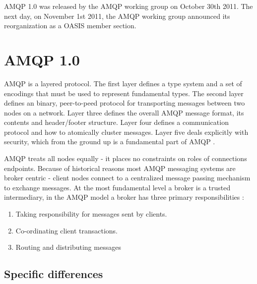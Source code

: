 \documentclass{thesis}
\begin{document}

AMQP 1.0 was released by the AMQP working group on October 30th 2011.  The next day, on November 1st 2011, the AMQP working group announced its reorganization as a OASIS member section. \cite{AMQP}

\section{AMQP 1.0}

AMQP is a layered protocol.  The first layer defines a type system and a set of encodings that must be used to represent fundamental types.  The second layer defines an binary, peer-to-peed protocol for transporting messages between two nodes on a network.  Layer three defines the overall AMQP message format, its contents and header/footer structure.  Layer four defines a communication protocol and how to atomically cluster messages.  Layer five deals explicitly with security, which from the ground up is a fundamental part of AMQP \cite{AMQP1.0}. 


AMQP treats all nodes equally - it places no constraints on roles of connections endpoints.   Because of historical reasons most AMQP messaging systems are broker centric - client nodes connect to a centralized message passing mechanism to exchange messages.  At the most fundamental level a broker is a trusted intermediary, in the AMQP model a broker has three primary responsibilities \cite{UNKNOWN}:


\begin{enumerate}
\item Taking responsibility for messages sent by clients.
\item Co-ordinating client transactions.
\item Routing and distributing messages 
\end{enumerate}



\subsection {Specific differences}
\end{document}
